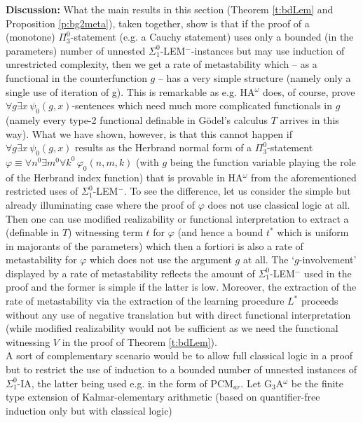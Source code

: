 {\bf Discussion:} What the main results in this section (Theorem 
\ref{t:bdLem} and Proposition \ref{p:bg2meta}), taken together, show 
is that if the proof of a (monotone) $\Pi^0_3$-statement (e.g. a 
Cauchy statement) uses only a bounded (in the 
parameters) number of unnested 
$\Sigma^0_1$-LEM$^-$-instances but may use induction 
of unrestricted complexity, then we get a rate of metastability which 
-- as a functional in the counterfunction $g$ -- has a very simple structure 
(namely only a single use of iteration of g). This is remarkable as e.g. 
HA$^{\omega}$ does, of course, 
prove $\forall g \exists x\,\psi_0(g,x)$-sentences 
which need 
much more complicated functionals in $g$ (namely every type-2 functional
definable in G\"odel's calculus $T$ arrives in this way). What we have shown, 
however, is that this cannot happen if $\forall g \exists x\,\psi_0(g,x)$
results as the Herbrand normal form of a $\Pi^0_3$-statement 
$\varphi\equiv \forall n^0\exists m^0\forall k^0\,\varphi_0(n,m,k)$ 
(with $g$ being the function variable playing the role of the Herbrand 
index function) that is provable 
in HA$^{\omega}$ from the aforementioned restricted uses of 
$\Sigma^0_1$-LEM$^-.$ To see the difference, 
let us consider the simple but already illuminating 
case where the proof of $\varphi$ does not use classical logic 
at all. Then one can use modified realizability or functional interpretation 
to extract a (definable in $T$) witnessing term $t$ for $\varphi$ 
(and hence a bound $t^*$ which is uniform in majorants of the parameters) 
which then a fortiori is also a rate of metastability for $\varphi$ 
which does not use the argument $g$ at all.
The `$g$-involvement' displayed by a rate of metastability reflects the 
amount of $\Sigma^0_1$-LEM$^-$ used in the proof and the former 
is simple if the latter is low. Moreover, the extraction of the rate of 
metastability via the extraction of the learning procedure $L^*$ proceeds 
without any use of negative translation but with direct functional 
interpretation (while modified realizability would not be sufficient as 
we need the functional witnessing $V$ in the proof of Theorem 
\ref{t:bdLem}).
\\[2mm] 
A sort of complementary scenario would be to allow full classical logic 
in a proof but to restrict the use of induction to a bounded number of 
unnested instances of $\Sigma^0_1$-IA, the latter being used e.g. in 
the form of PCM$_{ar}.$ Let {\rm G$_3$A$^{\omega}$} be 
the finite type extension of Kalmar-elementary 
arithmetic (based on quantifier-free induction only but with classical logic) 
